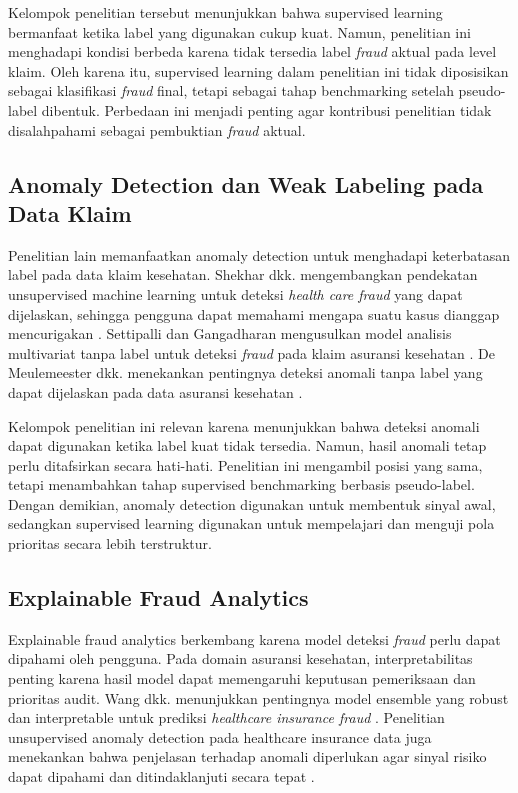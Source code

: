Kelompok penelitian tersebut menunjukkan bahwa supervised learning bermanfaat ketika label yang digunakan cukup kuat. Namun, penelitian ini menghadapi kondisi berbeda karena tidak tersedia label \emph{fraud} aktual pada level klaim. Oleh karena itu, supervised learning dalam penelitian ini tidak diposisikan sebagai klasifikasi \emph{fraud} final, tetapi sebagai tahap benchmarking setelah pseudo-label dibentuk. Perbedaan ini menjadi penting agar kontribusi penelitian tidak disalahpahami sebagai pembuktian \emph{fraud} aktual.

\subsection{Anomaly Detection dan Weak Labeling pada Data Klaim}\label{anomaly-detection-dan-weak-labeling-pada-data-klaim}

Penelitian lain memanfaatkan anomaly detection untuk menghadapi keterbatasan label pada data klaim kesehatan. Shekhar dkk. mengembangkan pendekatan unsupervised machine learning untuk deteksi \emph{health care fraud} yang dapat dijelaskan, sehingga pengguna dapat memahami mengapa suatu kasus dianggap mencurigakan \citep{shekhar2023}. Settipalli dan Gangadharan mengusulkan model analisis multivariat tanpa label untuk deteksi \emph{fraud} pada klaim asuransi kesehatan \citep{settipalli2023}. De Meulemeester dkk. menekankan pentingnya deteksi anomali tanpa label yang dapat dijelaskan pada data asuransi kesehatan \citep{meulemeester2025}.

Kelompok penelitian ini relevan karena menunjukkan bahwa deteksi anomali dapat digunakan ketika label kuat tidak tersedia. Namun, hasil anomali tetap perlu ditafsirkan secara hati-hati. Penelitian ini mengambil posisi yang sama, tetapi menambahkan tahap supervised benchmarking berbasis pseudo-label. Dengan demikian, anomaly detection digunakan untuk membentuk sinyal awal, sedangkan supervised learning digunakan untuk mempelajari dan menguji pola prioritas secara lebih terstruktur.

\subsection{Explainable Fraud Analytics}\label{explainable-fraud-analytics}

Explainable fraud analytics berkembang karena model deteksi \emph{fraud} perlu dapat dipahami oleh pengguna. Pada domain asuransi kesehatan, interpretabilitas penting karena hasil model dapat memengaruhi keputusan pemeriksaan dan prioritas audit. Wang dkk. menunjukkan pentingnya model ensemble yang robust dan interpretable untuk prediksi \emph{healthcare insurance fraud} \citep{wang2025}. Penelitian unsupervised anomaly detection pada healthcare insurance data juga menekankan bahwa penjelasan terhadap anomali diperlukan agar sinyal risiko dapat dipahami dan ditindaklanjuti secara tepat \citep{meulemeester2025}.

